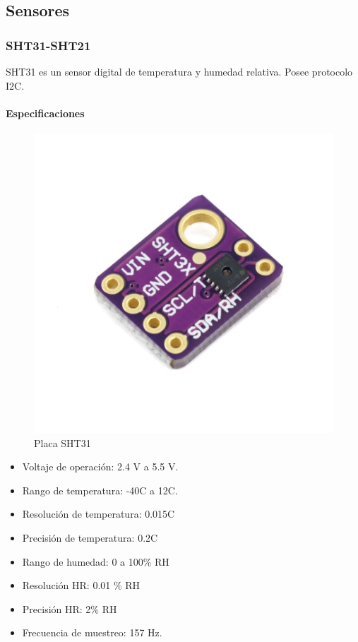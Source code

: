 
\subsection{Sensores}
	\subsubsection{SHT31-SHT21}
	SHT31 es un sensor digital de temperatura y humedad relativa. Posee protocolo I2C.
	\paragraph*{Especificaciones}
	\begin{figure}
		\includegraphics[scale=0.35]{SHT31.png}
		\caption{Placa SHT31}
		\label{fig:SHT31}
	\end{figure}
		\begin{itemize}
			\item   Voltaje de operación: 2.4 V a 5.5 V.
			\item	Rango de temperatura: -40\grad C a 12\grad C.
			\item   Resolución de temperatura: 0.015\grad C
			\item	Precisión de temperatura: 0.2\grad C 
			\item	Rango de humedad: 0 a 100\% RH
			\item   Resolución HR: 0.01 \% RH
			\item   Precisión HR: 2\% RH
			\item Frecuencia de muestreo: 157 Hz.
		\end{itemize}

